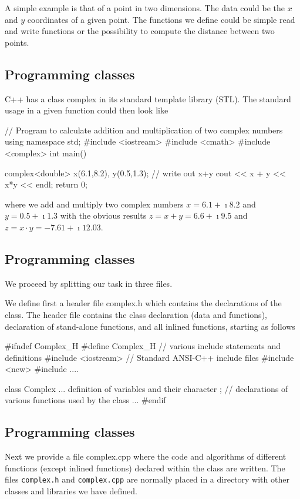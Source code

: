 \documentclass[%
oneside,                 %
final,                   %
10pt]{article}
\begin{document}
{{{{{{{A simple example is that of a point in two dimensions.
The data could be the $x$ and $y$ coordinates of a given  point. The functions
we define could be simple read and write functions or the possibility to compute the distance between two points.

\subsection{Programming classes}

C++ has a class complex in its standard
template library (STL). The standard usage in a given function could then look like

\bcppcod
// Program to calculate addition and multiplication of two complex numbers
using namespace std;
#include <iostream>
#include <cmath>
#include <complex>
int main()
{
  complex<double> x(6.1,8.2), y(0.5,1.3);
  // write out x+y
  cout << x + y << x*y  << endl;
  return 0;

\ecppcod
where we add and multiply two complex numbers $x=6.1+\imath 8.2$ and $y=0.5+\imath 1.3$ with the obvious results
$z=x+y=6.6+\imath 9.5$ and $z=x\cdot y= -7.61+\imath 12.03$.

\subsection{Programming classes}

We proceed by  splitting our task in three files.

We define first a header file complex.h  which contains the declarations of
the class. The header file contains the class declaration (data and
functions), declaration of stand-alone functions, and all inlined
functions, starting as follows

\bcppcod
#ifndef Complex_H
#define Complex_H
//   various include statements and definitions
#include <iostream>          // Standard ANSI-C++ include files
#include <new>
#include ....

class Complex
{...
definition of variables and their character
};
//   declarations of various functions used by the class
...
#endif
\ecppcod

\subsection{Programming classes}

Next we provide a file complex.cpp where the code and algorithms of
different functions (except inlined functions) declared within the
class are written.  The files \Verb!complex.h! and \Verb!complex.cpp! are normally
placed in a directory with other classes and libraries we have
defined.

}}}}}}}}
\end{document}
